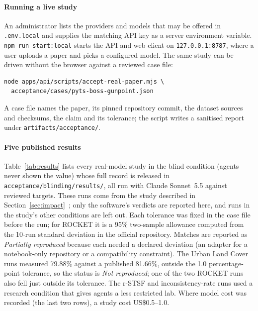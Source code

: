 \documentclass[preprint,12pt]{elsarticle}
\newcommand{\code}[1]{\texttt{#1}}
\begin{document}
\paragraph{Running a live study}
An administrator lists the providers and models that may be offered in
\code{.env.local} and supplies the matching API key as a server environment
variable. \code{npm run start:local} starts the API and web client on
\code{127.0.0.1:8787}, where a user uploads a paper and picks a configured
model. The same study can be driven without the browser against a reviewed
case file:
\begin{lstlisting}
node apps/api/scripts/accept-real-paper.mjs \
  acceptance/cases/pyts-boss-gunpoint.json
\end{lstlisting}
A case file names the paper, its pinned repository commit, the dataset sources
and checksums, the claim and its tolerance; the script writes a sanitised report
under \code{artifacts/acceptance/}. 

\paragraph{Five published results}
Table~\ref{tab:results} lists every real-model study in the blind condition
(agents never shown the value) whose full record is released in
\code{acceptance/blinding/results/}, all run with Claude Sonnet~5.5 against
reviewed targets. These runs come from the study described in
Section~\ref{sec:impact}~\cite{bhat2026blinded}; only the software's verdicts are
reported here, and runs in the study's other conditions are left out. Each tolerance was fixed in the case file
before the run; for ROCKET it is a 95\% two-sample allowance computed from the
10-run standard deviation in the official repository. Matches are reported as
\emph{Partially reproduced} because each needed a declared deviation (an
adapter for a notebook-only repository or a compatibility constraint). The
Urban Land Cover runs measured 79.88\% against a published 81.66\%, outside the
1.0 percentage-point tolerance, so the status is \emph{Not reproduced}; one of
the two ROCKET runs also fell just outside its tolerance. The r-STSF and inconsistency-rate
runs used a research condition that gives agents a less restricted lab. Where model cost was recorded
(the last two rows), a study cost US\$0.5--1.0.
\end{document}
